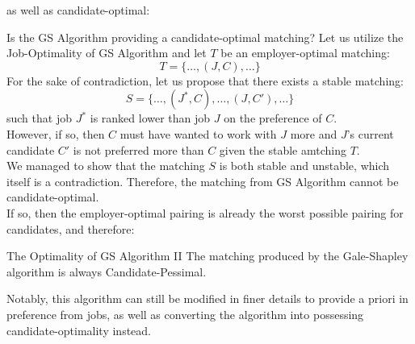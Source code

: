 as well as candidate-optimal:
\begin{ln-think}{Is the GS Algorithm providing a candidate-optimal matching?}{}
    Let us utilize the Job-Optimality of GS Algorithm and let $T$ be an employer-optimal matching:
    \[T = \{\dots, (J, C), \dots\}\]
    For the sake of contradiction, let us propose that there exists a stable matching:
    \[S = \{\dots, (J^*, C), \dots, (J, C'), \dots\}\]
    such that job $J^*$ is ranked lower than job $J$ on the preference of $C$. \\
    However, if so, then $C$ must have wanted to work with $J$ more and $J$'s current candidate $C'$ is not preferred more than $C$ given the stable amtching $T$. \\
    We managed to show that the matching $S$ is both stable and unstable, which itself is a contradiction. Therefore, the matching from GS Algorithm cannot be candidate-optimal. \\
    If so, then the employer-optimal pairing is already the worst possible pairing for candidates, and therefore:
    \begin{ln-theorem}{The Optimality of GS Algorithm II}{}
        The matching produced by the Gale-Shapley algorithm is always Candidate-Pessimal.
    \end{ln-theorem}
\end{ln-think}
Notably, this algorithm can still be modified in finer details to provide a priori in preference from jobs, as well as converting the algorithm into possessing candidate-optimality instead.

